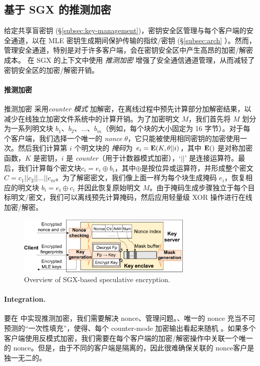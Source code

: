 \subsection{基于 SGX 的推测加密}
\label{subsec:encryption}

给定共享盲密钥 (\S\ref{subsec:key-management})，密钥安全区管理与每个客户端的安全通道，以在 MLE 密钥生成期间保护传输的指纹/密钥 (\S\ref{subsec:arch} ）。然而，管理安全通道，特别是对于许多客户端，会在密钥安全区中产生高昂的加密/解密成本。 \sysname 在 SGX 的上下文中使用 {\em 推测加密} \cite{eduardo19} 增强了安全通信通道管理，从而减轻了密钥安全区的加密/解密开销。

\paragraph{推测加密} 推测加密 \cite{eduardo19} 采用{\em counter 模式} \cite{counter} 加解密，在离线过程中预先计算部分加解密结果，以减少在线独立加密文件系统中的计算开销。为了加密明文 $M$，我们首先将 $M$ 划分为一系列明文块 $b_1、b_2、\ldots、b_m$（例如，每个块的大小固定为 16 字节）。对于每个客户端，我们选择一个唯一的 {\em nonce} $\theta$，它只能被使用相同密钥的加密使用一次。然后我们计算第 $i$ 个明文块的 {\em 掩码}为 $e_i = {\bf E}(K, \theta || i)$，其中 ${\bf E}()$ 是对称加密函数，$K$ 是密钥，$i$ 是 {\em counter}（用于计数器模式加密），`$||$' 是连接运算符。最后，我们计算每个密文块$c_i = e_i \oplus b_i $，其中$\oplus$是按位异或运算符，并形成整个密文$C = c_1 || c_2 || \ldots || c_m$。为了解密密文，我们像上面一样为每个块生成掩码 $e_i$，恢复相应的明文块 $b_i = e_i \oplus c_i$ 并因此恢复原始明文 $M$。由于掩码生成步骤独立于每个目标明文/密文，我们可以离线预先计算掩码，然后应用轻量级 XOR 操作进行在线加密/解密。

\begin{figure}[t]
\centering
\includegraphics[width=3.3in]{pic/sgxdedup/encryption.pdf}
\caption{Overview of SGX-based speculative encryption.}
\label{fig:SpecEnc}
\end{figure}

\paragraph{Integration.} 要在 \sysname 中实现推测加密，我们需要解决 nonce、管理问题。、唯一的 nonce 充当不可预测的“一次性填充”，使得、每个 counter-mode 加密输出看起来随机 \cite{counter}。如果多个客户端使用反模式加密，我们需要在每个客户端的加密/解密操作中关联一个唯一的 nonce。但是，由于不同的客户端是隔离的，因此很难确保关联的 nonce客户是独一无二的。

